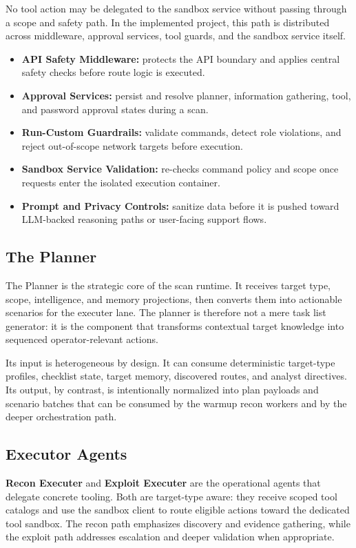 \documentclass[12pt,a4paper]{report}
\begin{document}
No tool action may be delegated to the sandbox service without passing through a
scope and safety path. In the implemented project, this path is distributed across
middleware, approval services, tool guards, and the sandbox service itself.

\begin{itemize}
    \item \textbf{API Safety Middleware:} protects the API boundary and applies
    central safety checks before route logic is executed.
    \item \textbf{Approval Services:} persist and resolve planner, information
    gathering, tool, and password approval states during a scan.
    \item \textbf{Run-Custom Guardrails:} validate commands, detect role
    violations, and reject out-of-scope network targets before execution.
    \item \textbf{Sandbox Service Validation:} re-checks command policy and scope
    once requests enter the isolated execution container.
    \item \textbf{Prompt and Privacy Controls:} sanitize data before it is pushed
    toward LLM-backed reasoning paths or user-facing support flows.
\end{itemize}

\subsection{The Planner}

The Planner is the strategic core of the scan runtime. It receives target type,
scope, intelligence, and memory projections, then converts them into actionable
scenarios for the executer lane. The planner is therefore not a mere task list
generator: it is the component that transforms contextual target knowledge into
sequenced operator-relevant actions.

Its input is heterogeneous by design. It can consume deterministic target-type
profiles, checklist state, target memory, discovered routes, and analyst directives.
Its output, by contrast, is intentionally normalized into plan payloads and scenario
batches that can be consumed by the warmup recon workers and by the deeper
orchestration path.

\subsection{Executor Agents}

\textbf{Recon Executer} and \textbf{Exploit Executer} are the operational agents that
delegate concrete tooling. Both are target-type aware: they receive scoped tool
catalogs and use the sandbox client to route eligible actions toward the dedicated
tool sandbox. The recon path emphasizes discovery and evidence gathering, while the
exploit path addresses escalation and deeper validation when appropriate.
\end{document}
